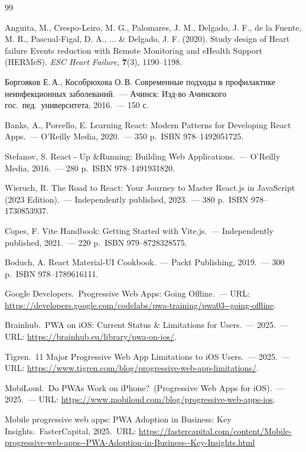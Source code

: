 \begin{thebibliography}{99}

    Anguita, M., Crespo-Leiro, M. G., Palomares, J. M., Delgado, J. F., de la Fuente, M. R., Pascual-Figal, D. A., ... \& Delgado, J. F. (2020).
    Study design of Heart failure Events reduction with Remote Monitoring and eHealth Support (HERMeS).
    \textit{ESC Heart Failure}, \textbf{7}(3), 1190–1198.


     Боргояков Е.\,А., Кособрюхова О.\,В. Современные подходы в профилактике неинфекционных заболеваний.\ — Ачинск: Изд-во Ачинского гос.\ пед.\ университета, 2016.\ — 150 с.

     Banks, A., Porcello, E. Learning React: Modern Patterns for Developing React Apps.\ — O'Reilly Media, 2020.\ — 350 p.\ ISBN 978--1492051725.

     Stefanov, S. React - Up \&Running: Building Web Applications.\ — O'Reilly Media, 2016.\ — 280 p.\ ISBN 978--1491931820.

     Wieruch, R. The Road to React: Your Journey to Master React.js in JavaScript (2023 Edition).\ — Independently published, 2023.\ — 380 p.\ ISBN 978--1730853937.

     Copes, F. Vite Handbook: Getting Started with Vite.js.\ — Independently published, 2021.\ — 220 p.\ ISBN 979--8728328575.

     Boduch, A. React Material-UI Cookbook.\ — Packt Publishing, 2019.\ — 300 p.\ ISBN 978--1789616111.

     Google Developers.\ Progressive Web Apps: Going Offline.\ — URL: \url{https://developers.google.com/codelabs/pwa-training/pwa03--going-offline}.

     Brainhub.\ PWA on iOS: Current Status \& Limitations for Users.\ — 2025.\ — URL: \url{https://brainhub.eu/library/pwa-on-ios/}.

     Tigren.\ 11 Major Progressive Web App Limitations to iOS Users.\ — 2025.\ — URL: \url{https://www.tigren.com/blog/progressive-web-app-limitations/}.

     MobiLoud.\ Do PWAs Work on iPhone?\ (Progressive Web Apps for iOS).\ — 2025.\ — URL: \url{https://www.mobiloud.com/blog/progressive-web-apps-ios}.

     Mobile progressive web apps: PWA Adoption in Business: Key Insights.\ FasterCapital, 2025.\ URL: \url{https://fastercapital.com/content/Mobile-progressive-web-apps--PWA-Adoption-in-Business--Key-Insights.html}



\end{thebibliography}
